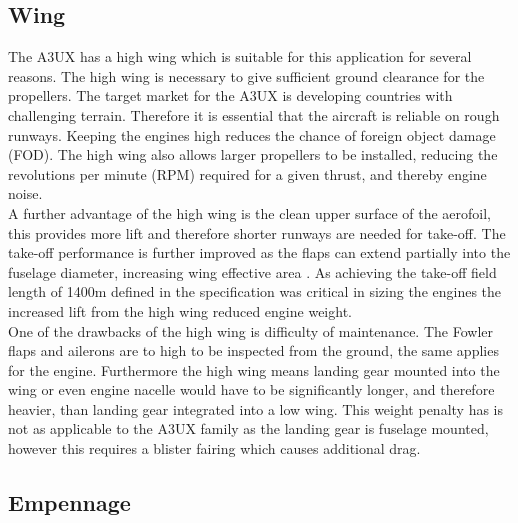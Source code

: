 \documentclass[11pt]{article}
\begin{document}
\subsection{Wing}

The A3UX has a high wing which is suitable for this application for several reasons. The high wing is necessary to give sufficient ground clearance for the propellers. The target market for the A3UX is developing countries with challenging terrain. Therefore it is essential that the aircraft is reliable on rough runways. Keeping the engines high reduces the chance of foreign object damage (FOD). The high wing also allows larger propellers to be installed, reducing the revolutions per minute (RPM) required for a given thrust, and thereby engine noise. \\
A further advantage of the high wing is the clean upper surface of the aerofoil, this provides more lift and therefore shorter runways are needed for take-off. The take-off performance is further improved as the flaps can extend partially into the fuselage diameter, increasing wing effective area \cite{kit}. As achieving the take-off field length of 1400m defined in the specification \cite{SPEC} was critical in sizing the engines \cite{josh} the increased lift from the high wing reduced engine weight.\\
One of the drawbacks of the high wing is difficulty of maintenance. The Fowler flaps and ailerons are to high to be inspected from the ground, the same applies for the engine. Furthermore the high wing means landing gear mounted into the wing or even engine nacelle would have to be significantly longer, and therefore heavier, than landing gear integrated into a low wing. This weight penalty has is not as applicable to the A3UX family as the landing gear is fuselage mounted, however this requires a blister fairing which causes additional drag.


\subsection{Empennage}
\end{document}
